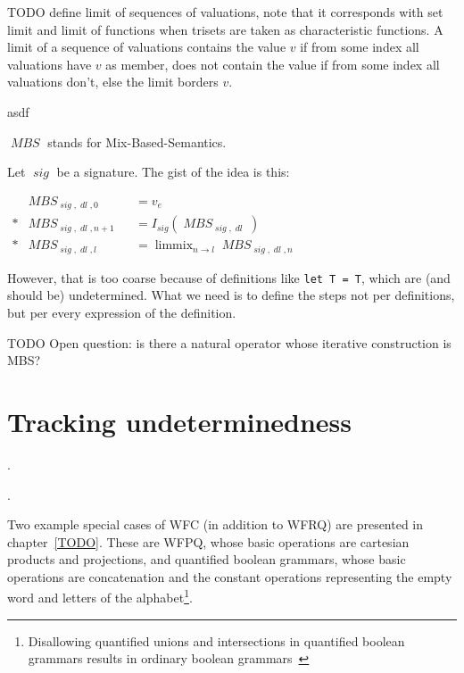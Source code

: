 \documentclass[oneside,12pt]{book}
\newcounter{question}
\theoremstyle{definition}
\theoremstyle{remark}
\newcommand{\tde}{\raisebox{0.5ex}{\texttildelow}}
\newcommand\var[1]{\mathop{\mathit{#1}}\nolimits}
\newcommand{\sig}{\var{sig}}
\newcommand{\dl}{\var{dl}}
\DeclareMathOperator{\mix}{mix}
\DeclareMathOperator*{\limMix}{\lim \mix}
\newcommand{\MBS}{\var{MBS}}
\begin{document}
TODO define limit of sequences of valuations, note that it corresponds with set limit
and limit of functions when trisets are taken as characteristic functions.
A limit of a sequence of valuations contains the value $v$
if from some index all valuations have $v$ as member, does not contain
the value if from some index all valuations don't, else the limit borders $v$.

asdf

$\MBS$ stands for Mix-Based-Semantics.

\begin{defBox}
  Let $\sig$ be a signature. The gist of the idea is this:
  
  \medskip \noindent
  $\begin{aligned}
    & \MBS_{\sig,\dl,0} & &= v_e \\*
    & \MBS_{\sig,\dl,n+1} & &= I_{\sig}(\MBS_{\sig,\dl}) \\*
    & \MBS_{\sig,\dl,l} & &= \limMix_{n \to l} \MBS_{\sig,\dl,n}
  \end{aligned}$
\end{defBox}

However, that is too coarse because of definitions like \texttt{let T = \tde \tde T},
which are (and should be) undetermined. What we need is to define the steps not
per definitions, but per every expression of the definition.

TODO
Open question: is there a natural operator whose iterative construction is MBS?


\chapter{Tracking undeterminedness}



























.

.

Two example special cases of WFC (in addition to WFRQ) are presented in
chapter~\ref{TODO}. These are WFPQ, whose basic operations are cartesian
products and projections, and quantified boolean grammars, whose basic operations
are concatenation and the constant operations representing the empty word and
letters of the alphabet\footnote{Disallowing quantified unions and intersections
in quantified boolean grammars results in ordinary boolean grammars~\cite{TODO}}.
\end{document}
